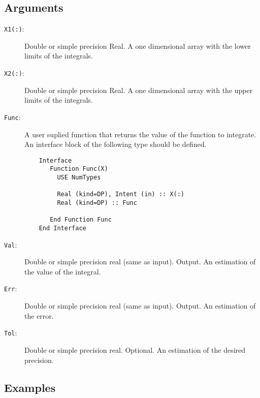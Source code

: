 \subsection{Arguments}

\begin{description}
\item[\texttt{X1(:)}:] Double or simple precision Real. A one dimensional
  array with the lower limits of the integrals.
\item[\texttt{X2(:)}:] Double or simple precision Real. A one dimensional
  array with the upper limits of the integrals.
\item[\texttt{Func}: ] A user suplied function that returns the value
  of the function to integrate. An interface block of the following
  type should be defined. 
\begin{verbatim}
    Interface 
       Function Func(X)
         USE NumTypes
         
         Real (kind=DP), Intent (in) :: X(:)
         Real (kind=DP) :: Func

       End Function Func
    End Interface
\end{verbatim}
\item[\texttt{Val}: ] Double or simple precision real (same as
  input). Output. An estimation of the value of the integral.
\item[\texttt{Err}: ] Double or simple precision real (same as
  input). Output. An estimation of the error.
\item[\texttt{Tol}: ] Double or simple precision real. Optional. An
  estimation of the desired precision.
\end{description}

\subsection{Examples}

